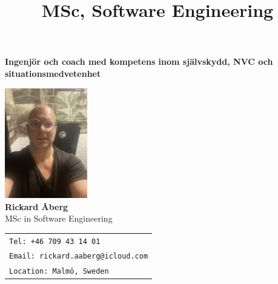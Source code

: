 \documentclass[11pt,a4paper,sans]{moderncv}
\title{MSc, Software Engineering}
\makeatletter
\let\oldmakecvtitle\makecvtitle
\renewcommand*{\makecvtitle}{%
    \vspace*{-1em}
    \begin{center}
      \texttt{[image: \\@photo]}
    \end{center}
    \vspace{0.5em}
    \oldmakecvtitle
  }%
\makeatother
\begin{document}
\begin{center}
  
\vspace{1cm}
\begin{center}
    \large\textbf{Ingenjör och coach med kompetens inom självskydd, NVC och situationsmedvetenhet}
\end{center}
\vspace{1cm}

    
    \includegraphics[width=3.6cm]{../../roles_CVs/photos/me.png
} \\[1em]
    
    {\LARGE \textbf{Rickard Åberg}}\\[0.2em]
    {\large MSc in Software Engineering}\\[2em]
  
{\footnotesize
\begin{tabular}{l}
\texttt{Tel: +46 709 43 14 01} \\
\texttt{Email: rickard.aaberg@icloud.com} \\
\texttt{Location: Malmö, Sweden}
\end{tabular}
}
  
    \vspace*{1cm}
\end{center}
\newpage

\renewcommand*{\namefont}{\LARGE\sffamily\mdseries}
\renewcommand*{\titlefont}{\Large\sffamily\mdseries}





%





\end{document}
